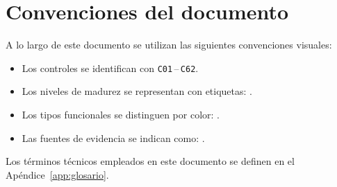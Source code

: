 \section{Convenciones del documento}

A lo largo de este documento se utilizan las siguientes convenciones visuales:

\begin{itemize}[leftmargin=2em]
  \item Los controles se identifican con \texttt{C01}\,--\,\texttt{C62}.
  \item Los niveles de madurez se representan con etiquetas:      .
  \item Los tipos funcionales se distinguen por color: \badgePreventivo{} \badgeDetectivo{} \badgeCorrectivo{} \badgeGobernanza{}.
  \item Las fuentes de evidencia se indican como: \badgeConfig{} \badgeExperimental{} \badgeDeclarativo{}.
\end{itemize}

Los términos técnicos empleados en este documento se definen en el Apéndice~\ref{app:glosario}.